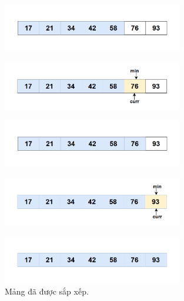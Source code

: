 \begin{itemize}
\begin{figure}[H]
    \centering
    \includegraphics[width=0.7\textwidth]{img/selection sort_suadoi/11.png} 
\end{figure}

\begin{figure}[H]
    \centering
    \includegraphics[width=0.7\textwidth]{img/selection sort_suadoi/12.png} 
\end{figure}

\begin{figure}[H]
    \centering
    \includegraphics[width=0.7\textwidth]{img/selection sort_suadoi/13.png} 
\end{figure}

\begin{figure}[H]
    \centering
    \includegraphics[width=0.7\textwidth]{img/selection sort_suadoi/14.png} 
\end{figure}

\begin{figure}[H]
    \centering
    \includegraphics[width=0.7\textwidth]{img/selection sort_suadoi/15.png} 
    \caption{Mảng đã được sắp xếp.}
\end{figure}


\end{itemize}

